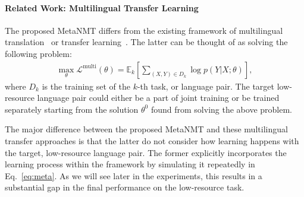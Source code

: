 










\paragraph{Related Work: Multilingual Transfer Learning}

The proposed MetaNMT differs from the existing framework of multilingual translation~\citep{lee2016fully,johnson2016google,gu2018universal} or transfer learning~\citep{zoph2016transfer}. The latter can be thought of as solving the following problem:
\begin{align*}
    \max_{\theta} \mathcal{L}^{\text{multi}}(\theta) = \mathbb{E}_k\left[
    \sum_{(X,Y) \in D_k} \log p(Y|X; \theta)
    \right],
\end{align*}
where $D_k$ is the training set of the $k$-th task, or language pair. The target low-resource language pair could either be a part of joint training or be trained separately starting from the solution $\theta^0$ found from solving the above problem. 

The major difference between the proposed MetaNMT and these multilingual transfer approaches is that the latter do not consider how learning happens with the target, low-resource language pair. The former explicitly incorporates the learning process within the framework by simulating it repeatedly in Eq.~\eqref{eq:meta}. As we will see later in the experiments, this results in a substantial gap in the final performance on the low-resource task. 

